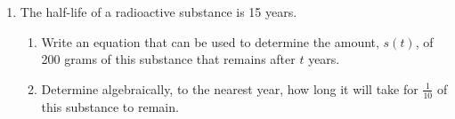 \documentclass[12pt, twoside]{article}
\begin{document}
\begin{enumerate}[itemsep=0.5cm]
\item The half-life of a radioactive substance is 15 years.
\begin{enumerate}
    \item Write an equation that can be used to determine the amount, \( s(t) \), of 200 grams of this substance that remains after \( t \) years.
    \item Determine algebraically, to the nearest year, how long it will take for \(\frac{1}{10}\) of this substance to remain.
\end{enumerate}


\end{enumerate}
\end{document}
